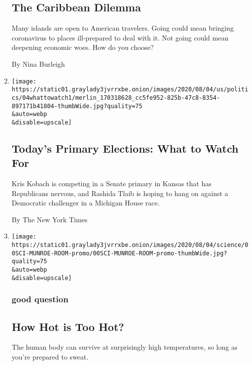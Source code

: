 \begin{enumerate}
{  \subsection{The Caribbean Dilemma}\label{the-caribbean-dilemma}}

  Many islands are open to American travelers. Going could mean bringing
  coronavirus to places ill-prepared to deal with it. Not going could
  mean deepening economic woes. How do you choose?

  By Nina Burleigh
\item
  \href{/2020/08/04/us/elections/primary-election-michigan-arizona-kansas.html}{}

  \texttt{[image: https://static01.graylady3jvrrxbe.onion/images/2020/08/04/us/politics/04whattowatch1/merlin\_170318628\_cc5fe952-825b-47c8-8354-897171b41804-thumbWide.jpg?quality=75\\\&auto=webp\\\&disable=upscale]}

  \hypertarget{todays-primary-elections-what-to-watch-for}{%
  \subsection{Today's Primary Elections: What to Watch
  For}\label{todays-primary-elections-what-to-watch-for}}

  Kris Kobach is competing in a Senate primary in Kansas that has
  Republicans nervous, and Rashida Tlaib is hoping to hang on against a
  Democratic challenger in a Michigan House race.

  By The New York Times
\item
  \href{/2020/08/04/science/randall-munroe-xkcd-temperature.html}{}

  \texttt{[image: https://static01.graylady3jvrrxbe.onion/images/2020/08/04/science/00SCI-MUNROE-ROOM-promo/00SCI-MUNROE-ROOM-promo-thumbWide.jpg?quality=75\\\&auto=webp\\\&disable=upscale]}

  \hypertarget{good-question}{%
  \subsubsection{good question}\label{good-question}}

  \hypertarget{how-hot-is-too-hot}{%
  \subsection{How Hot is Too Hot?}\label{how-hot-is-too-hot}}

  The human body can survive at surprisingly high temperatures, so long
  as you're prepared to sweat.


\end{enumerate}
